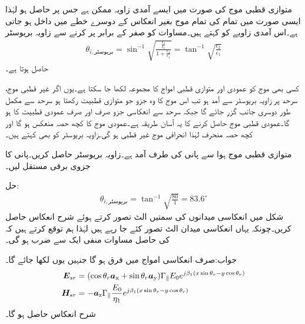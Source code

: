 متوازی قطبی موج کی صورت میں ایسے آمدی زاویہ ممکن ہے جس پر   حاصل ہو لہٰذا ایسی صورت میں تمام کی تمام موج بغیر انعکاس کے دوسرے خطے میں داخل ہو جاتی ہے۔اس آمدی زاویے کو  کہتے ہیں۔مساوات  کو صفر کے برابر پر کرنے سے زاویہ بریوسٹر 
\begin{align}
\theta_{i,\text{بریوسٹر}} =\sin^{-1} \sqrt{\frac{\frac{\epsilon_2}{\epsilon_1}}{1+\frac{\epsilon_2}{\epsilon_1}}}=\tan^{-1} \sqrt{\frac{\epsilon_2}{\epsilon_1}}
\end{align} 
حاصل ہوتا ہے۔

کسی بھی موج کو عمودی اور متوازی قطبی امواج کا مجموعہ لکھا جا سکتا ہے۔یوں اگر غیر قطبی موج، سرحد پر  زاویہ بریوسٹر سے آمد ہو تب اس موج کا وہ جزو جو متوازی قطبیت رکھتا ہو سرحد سے مکمل طور دوسری جانب گزر جائے گا جبکہ سرحد سے انعکاسی جزو صرف اور صرف عمودی قطبیت کا ہو گا۔عمودی قطبی موج حاصل کرنے کا یہ آسان طریقہ ہے۔عمودی موج کا کچھ حصہ منعکس ہو گا اور کچھ حصہ منحرف لہٰذا انحرافی موج غیر قطبی ہو گی۔زاویہ بریوسٹر کو  بھی کہتے ہیں۔  

متوازی قطبی موج ہوا سے پانی کی طرف آمد ہے۔زاویہ بریوسٹر حاصل کریں۔پانی کا جزوی برقی مستقل  لیں۔

حل:
\begin{align}
\theta_{i,\text{بریوسٹر}} =\tan^{-1} \sqrt{\frac{80}{1}}=83.6^{\circ}
\end{align} 
شکل  میں انعکاسی میدانوں کی سمتیں الٹ تصور کرتے ہوئے شرح انعکاس  حاصل کریں۔چونکہ یہاں انعکاسی میدان الٹ تصور کئے جا رہے ہیں لہٰذا ہم توقع کرتے ہیں کہ  کی حاصل مساوات منفی ایک سے ضرب ہو گی۔

جواب:صرف انعکاسی امواج میں فرق ہو گا جنہیں یوں لکھا جائے گا۔
\begin{align*}
{\ensuremath{{\boldsymbol{E}}}}_{sr}&= (\cos \theta_r {\boldsymbol{a}}_{\textup{x}}+\sin \theta_r {\boldsymbol{a}}_{\textup{y}})\Gamma_{\parallel} E_0 e^{ j \beta_1 (x \sin \theta_r-y\cos \theta_r)}\\
{{\boldsymbol{H}}}_{sr}&=-{\boldsymbol{a}}_{\textup{z}}\Gamma_{\parallel} \frac{ E_0}{\eta_1} e^{j \beta_1 (x \sin \theta_r-y\cos \theta_r)}
\end{align*}
شرح انعکاس  حاصل ہو گا۔

